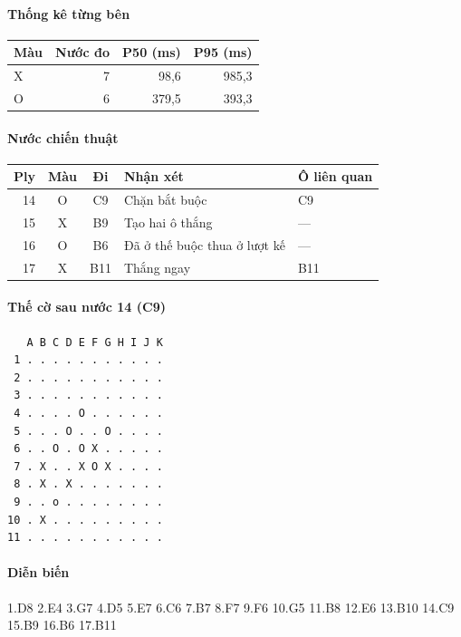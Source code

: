 \paragraph{Thống kê từng bên}
\begin{center}\small
\begin{tabular}{@{}lrrr@{}}
\toprule
Màu & Nước đo & P50 (ms) & P95 (ms) \\
\midrule
X & 7 & 98,6 & 985,3 \\
O & 6 & 379,5 & 393,3 \\
\bottomrule
\end{tabular}
\end{center}
\paragraph{Nước chiến thuật}
\begin{center}\small
\begin{tabular}{@{}rccll@{}}
\toprule
Ply & Màu & Đi & Nhận xét & Ô liên quan \\
\midrule
14 & O & C9 & Chặn bắt buộc & C9 \\
15 & X & B9 & Tạo hai ô thắng & — \\
16 & O & B6 & Đã ở thế buộc thua ở lượt kế & — \\
17 & X & B11 & Thắng ngay & B11 \\
\bottomrule
\end{tabular}
\end{center}
\paragraph{Thế cờ sau nước 14 (C9)}
\begin{verbatim}
   A B C D E F G H I J K
 1 . . . . . . . . . . .
 2 . . . . . . . . . . .
 3 . . . . . . . . . . .
 4 . . . . O . . . . . .
 5 . . . O . . O . . . .
 6 . . O . O X . . . . .
 7 . X . . X O X . . . .
 8 . X . X . . . . . . .
 9 . . o . . . . . . . .
10 . X . . . . . . . . .
11 . . . . . . . . . . .
\end{verbatim}
\paragraph{Diễn biến}
{\footnotesize 1.D8 2.E4 3.G7 4.D5 5.E7 6.C6 7.B7 8.F7 9.F6 10.G5 11.B8 12.E6 13.B10 14.C9 15.B9 16.B6 17.B11\par}

